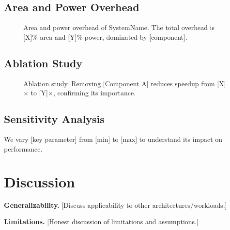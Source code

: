 \documentclass[sigplan,10pt]{acmart}
\newcommand{\system}{SystemName\xspace}
\newcommand{\para}[1]{\smallskip\noindent\textbf{#1.}}
\begin{document}
\subsection{Area and Power Overhead}
\label{sec:eval:overhead}

\begin{figure}[t]
  \centering
  \caption{Area and power overhead of \system. The total overhead
    is [X]\% area and [Y]\% power, dominated by [component].}
  \label{fig:overhead}
\end{figure}

\subsection{Ablation Study}
\label{sec:eval:ablation}

\begin{figure}[t]
  \centering
  \caption{Ablation study. Removing [Component A] reduces speedup
    from [X]$\times$ to [Y]$\times$, confirming its importance.}
  \label{fig:ablation}
\end{figure}

\subsection{Sensitivity Analysis}
\label{sec:eval:sensitivity}

We vary [key parameter] from [min] to [max] to understand its
impact on performance.

\section{Discussion}
\label{sec:discussion}

\para{Generalizability}
[Discuss applicability to other architectures/workloads.]

\para{Limitations}
[Honest discussion of limitations and assumptions.]

\end{document}
